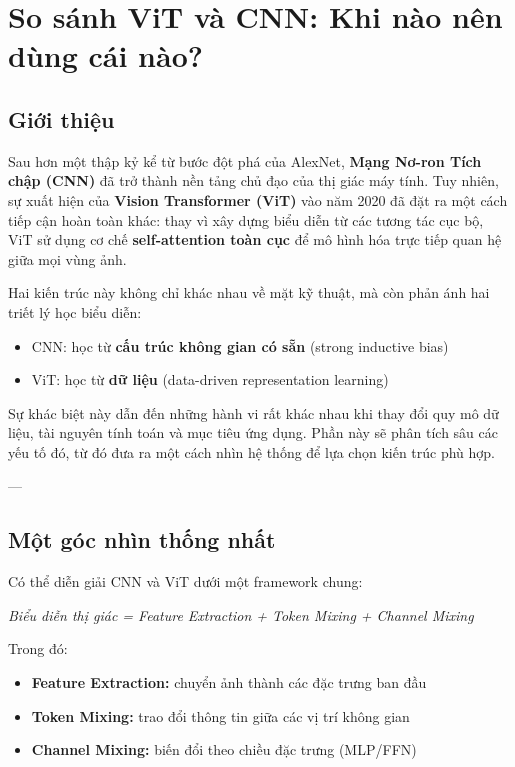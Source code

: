 \section{So sánh ViT và CNN: Khi nào nên dùng cái nào?}
\label{sec:vit_vs_cnn_comparison}

\subsection{Giới thiệu}
\label{subsec:comparison_intro}

Sau hơn một thập kỷ kể từ bước đột phá của AlexNet, \textbf{Mạng Nơ-ron Tích chập (CNN)} đã trở thành nền tảng chủ đạo của thị giác máy tính. Tuy nhiên, sự xuất hiện của \textbf{Vision Transformer (ViT)} vào năm 2020 đã đặt ra một cách tiếp cận hoàn toàn khác: thay vì xây dựng biểu diễn từ các tương tác cục bộ, ViT sử dụng cơ chế \textbf{self-attention toàn cục} để mô hình hóa trực tiếp quan hệ giữa mọi vùng ảnh.

Hai kiến trúc này không chỉ khác nhau về mặt kỹ thuật, mà còn phản ánh hai triết lý học biểu diễn:
\begin{itemize}
	\item CNN: học từ \textbf{cấu trúc không gian có sẵn} (strong inductive bias)
	\item ViT: học từ \textbf{dữ liệu} (data-driven representation learning)
\end{itemize}

Sự khác biệt này dẫn đến những hành vi rất khác nhau khi thay đổi quy mô dữ liệu, tài nguyên tính toán và mục tiêu ứng dụng. Phần này sẽ phân tích sâu các yếu tố đó, từ đó đưa ra một cách nhìn hệ thống để lựa chọn kiến trúc phù hợp.

---

\subsection{Một góc nhìn thống nhất}
\label{subsec:unified_view}

Có thể diễn giải CNN và ViT dưới một framework chung:

\begin{center}
	\textit{Biểu diễn thị giác = Feature Extraction + Token Mixing + Channel Mixing}
\end{center}

Trong đó:
\begin{itemize}
	\item \textbf{Feature Extraction:} chuyển ảnh thành các đặc trưng ban đầu
	\item \textbf{Token Mixing:} trao đổi thông tin giữa các vị trí không gian
	\item \textbf{Channel Mixing:} biến đổi theo chiều đặc trưng (MLP/FFN)
\end{itemize}

